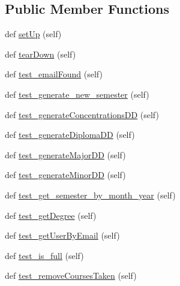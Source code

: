 \subsection*{Public Member Functions}
\begin{DoxyCompactItemize}
\item 
def \mbox{\hyperlink{classlanding_1_1tests_1_1test__logic_1_1YourTestClass_a8fc08e836ba1d71ef27e4fb442f9bf07}{set\+Up}} (self)
\item 
def \mbox{\hyperlink{classlanding_1_1tests_1_1test__logic_1_1YourTestClass_aa5874621de0a637a917adb181465565b}{tear\+Down}} (self)
\item 
def \mbox{\hyperlink{classlanding_1_1tests_1_1test__logic_1_1YourTestClass_ad3383bb3b183fd5da69ed5af9ebf895f}{test\+\_\+email\+Found}} (self)
\item 
def \mbox{\hyperlink{classlanding_1_1tests_1_1test__logic_1_1YourTestClass_a217df4c55c33a905e5a8acedbabc2554}{test\+\_\+generate\+\_\+new\+\_\+semester}} (self)
\item 
def \mbox{\hyperlink{classlanding_1_1tests_1_1test__logic_1_1YourTestClass_a299e310958f4c2310742a166666ce54a}{test\+\_\+generate\+Concentrations\+DD}} (self)
\item 
def \mbox{\hyperlink{classlanding_1_1tests_1_1test__logic_1_1YourTestClass_a3bd96c391d99f1099fdd3145ec8bb244}{test\+\_\+generate\+Diploma\+DD}} (self)
\item 
def \mbox{\hyperlink{classlanding_1_1tests_1_1test__logic_1_1YourTestClass_a07dc170a7378ab65e26198097bf79421}{test\+\_\+generate\+Major\+DD}} (self)
\item 
def \mbox{\hyperlink{classlanding_1_1tests_1_1test__logic_1_1YourTestClass_a4ef706cd4dd8262484f5e25f04e5f673}{test\+\_\+generate\+Minor\+DD}} (self)
\item 
def \mbox{\hyperlink{classlanding_1_1tests_1_1test__logic_1_1YourTestClass_a7ccbc5812985183c73be2a72de119497}{test\+\_\+get\+\_\+semester\+\_\+by\+\_\+month\+\_\+year}} (self)
\item 
def \mbox{\hyperlink{classlanding_1_1tests_1_1test__logic_1_1YourTestClass_a9e136af10d0f563ebb4a3a1b1075a6ed}{test\+\_\+get\+Degree}} (self)
\item 
def \mbox{\hyperlink{classlanding_1_1tests_1_1test__logic_1_1YourTestClass_a052a9215642dc369fea184e2e6882b91}{test\+\_\+get\+User\+By\+Email}} (self)
\item 
def \mbox{\hyperlink{classlanding_1_1tests_1_1test__logic_1_1YourTestClass_a27205d7c768e925bf201ff242d7c6137}{test\+\_\+is\+\_\+full}} (self)
\item 
def \mbox{\hyperlink{classlanding_1_1tests_1_1test__logic_1_1YourTestClass_ac0dd592f4aa2af5461ed9e4622e6ff10}{test\+\_\+remove\+Courses\+Taken}} (self)
\end{DoxyCompactItemize}


